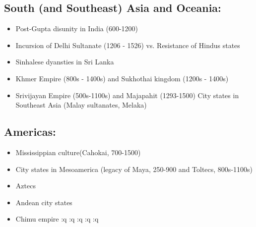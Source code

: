 \documentclass{report}
\begin{document}
\subsection{South (and Southeast) Asia and Oceania:}
\begin{itemize}
  \item Post-Gupta disunity in India (600-1200)
  \item Incursion of Delhi  Sultanate (1206 - 1526) vs. Resistance of Hindus states
  \item Sinhalese dyansties in Sri Lanka
  \item Khmer Empire (800s - 1400s) and Sukhothai kingdom (1200s - 1400s)
  \item Srivijayan Empire (500s-1100s) and Majapahit (1293-1500)
    City states in Southeast Asia (Malay sultanates, Melaka)
\end{itemize}

\subsection{Americas:}
\begin{itemize}
  \item Mississippian culture(Cahokai, 700-1500)
  \item City states in Mesoamerica (legacy of Maya, 250-900 and Toltecs, 800s-1100s)
  \item Aztecs
  \item Andean city states
  \item Chimu empire
  :q
  :q
  :q
:q
:q



\end{itemize}
\end{document}
